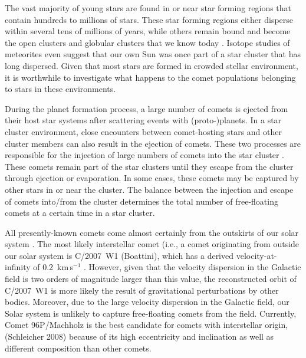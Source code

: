 \documentclass[usenatbib]{mn2e}
\newcommand{\kms}{km\,s$^{-1}$}
\begin{document}
The vast majority of young stars are found in or near star forming regions that contain hundreds to millions of stars. These star forming regions either disperse within several tens of millions of years, while others remain bound and become the open clusters and globular clusters that we know today \citep[e.g.,][]{de-Grijs:2007aa}. Isotope studies of meteorites even suggest that our own Sun was once part of a star cluster that has long dispersed. Given that most stars are formed in crowded stellar environment, it is worthwhile to investigate what happens to the comet populations belonging to stars in these environments. 

During the planet formation process, a large number of comets is ejected from their host star systems after scattering events with (proto-)planets. In a star cluster environment, close encounters between comet-hosting stars and other cluster members can also result in the ejection of comets. These two processes are responsible for the injection of large numbers of comets into the star cluster \citep[e.g.,][]{Brasser:2015aa}. These comets remain part of the star clusters until they escape from the cluster through ejection or evaporation. In some cases, these comets may be captured by other stars in or near the cluster. The balance between the injection and escape of comets into/from the cluster determines the total number of free-floating comets at a certain time in a star cluster. 


All presently-known comets come almost certainly from the outskirts of our solar system \citep{Dones:2015aa}. The most likely interstellar comet (i.e., a comet originating from outside our solar system is C/2007~W1 (Boattini), which has a derived velocity-at-infinity of 0.2~\kms{} \citep{Dybczynski:2015aa}. However, given that the velocity dispersion in the Galactic field is two orders of magnitude larger than this value, the reconstructed orbit of C/2007~W1 is more likely the result of gravitational perturbations by other bodies. Moreover, due to the large velocity dispersion in the Galactic field, our Solar system is unlikely to capture free-floating comets from the field. Currently, Comet 96P/Machholz is the best candidate for comets with interstellar origin, (Schleicher 2008) because of its high eccentricity and inclination as well as different composition than other comets.
\end{document}
